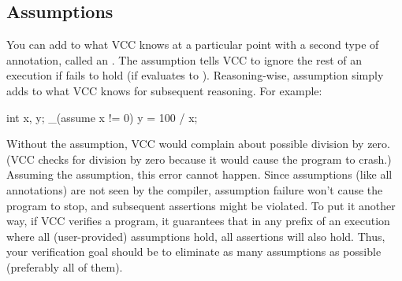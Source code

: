 \subsection{Assumptions}

You can add to what VCC knows at a particular point with a second
type of annotation, called an .
The assumption  tells VCC to ignore
the rest of an execution if  fails to hold (\ie if
 evaluates to ). 
Reasoning-wise, assumption simply adds  to what VCC
knows for subsequent reasoning. For example:
\begin{VCC}
int x, y;
_(assume x != 0)
y = 100 / x;
\end{VCC}
Without the assumption, VCC would complain about possible division by
zero. (VCC checks for division by zero because it would cause the
program to crash.)  Assuming the assumption, this error cannot happen.  
Since assumptions (like all annotations) are not seen by the compiler,
assumption failure won't cause the program to stop, and subsequent assertions
might be violated. To put it another way, if VCC verifies a program,
it guarantees that in any prefix of an execution
where all (user-provided) assumptions hold, all assertions will also
hold. Thus, your verification goal should be to eliminate as many assumptions as
possible (preferably all of them).


